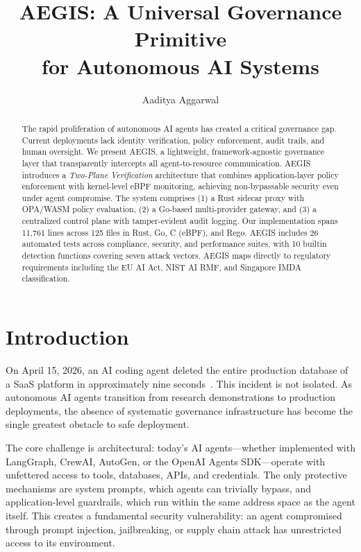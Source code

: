\documentclass[runningheads]{llncs}
\begin{document}
\title{AEGIS: A Universal Governance Primitive \\for Autonomous AI Systems}
\author{Aaditya Aggarwal}

\maketitle

\begin{abstract}
The rapid proliferation of autonomous AI agents has created a critical governance gap. Current deployments lack identity verification, policy enforcement, audit trails, and human oversight. We present AEGIS, a lightweight, framework-agnostic governance layer that transparently intercepts all agent-to-resource communication. AEGIS introduces a \emph{Two-Plane Verification} architecture that combines application-layer policy enforcement with kernel-level eBPF monitoring, achieving non-bypassable security even under agent compromise. The system comprises (1) a Rust sidecar proxy with OPA/WASM policy evaluation, (2) a Go-based multi-provider gateway, and (3) a centralized control plane with tamper-evident audit logging. Our implementation spans 11,761 lines across 125 files in Rust, Go, C (eBPF), and Rego. AEGIS includes 26 automated tests across compliance, security, and performance suites, with 10 builtin detection functions covering seven attack vectors. AEGIS maps directly to regulatory requirements including the EU AI Act, NIST AI RMF, and Singapore IMDA classification.

\end{abstract}

\section{Introduction}

On April 15, 2026, an AI coding agent deleted the entire production database of a SaaS platform in approximately nine seconds~\cite{incident2026}. This incident is not isolated. As autonomous AI agents transition from research demonstrations to production deployments, the absence of systematic governance infrastructure has become the single greatest obstacle to safe deployment.

The core challenge is architectural: today's AI agents---whether implemented with LangGraph, CrewAI, AutoGen, or the OpenAI Agents SDK---operate with unfettered access to tools, databases, APIs, and credentials. The only protective mechanisms are system prompts, which agents can trivially bypass, and application-level guardrails, which run within the same address space as the agent itself. This creates a fundamental security vulnerability: an agent compromised through prompt injection, jailbreaking, or supply chain attack has unrestricted access to its environment.
\end{document}
